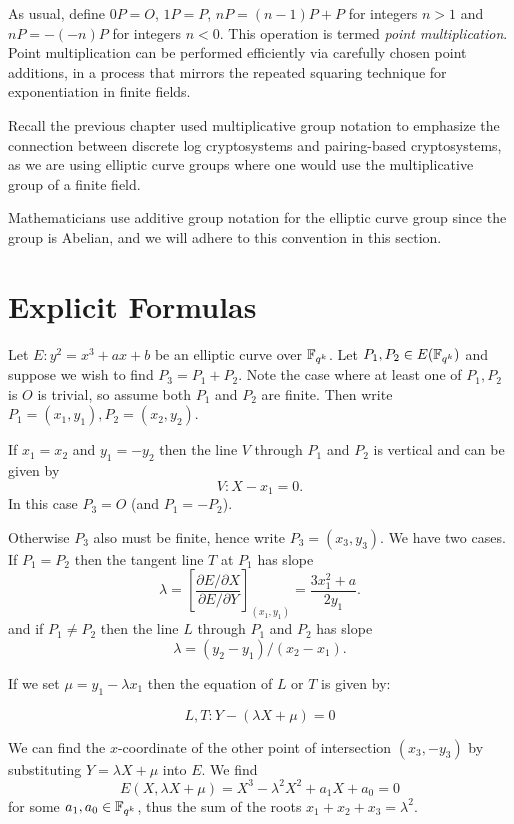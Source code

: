 As usual, define $0 P = O$, $1 P = P$,
$n P = (n-1)P + P$ for integers $n > 1$ and $n P = -(-n)P$ for integers
$n < 0$.
This operation is termed \emph{point multiplication}.
Point multiplication can be performed efficiently via carefully
chosen point additions, in a process that mirrors the repeated
squaring technique for exponentiation in finite fields.

Recall the previous chapter used multiplicative group notation to emphasize
the connection
between discrete log cryptosystems and pairing-based cryptosystems,
as we are using elliptic curve groups where one would use
the multiplicative group of a finite field.

Mathematicians use additive group notation for the elliptic curve group
since the group is Abelian, and we will adhere to this convention in this
section.

\section {Explicit Formulas}

Let $E: y^2 = x^3 + ax + b$ be an elliptic curve over $\mathbb{F}_{q^k}$. Let
$P_1, P_2 \in E(\mathbb{F}_{q^k})$ and suppose
we wish to find $P_3 = P_1 + P_2$.
Note the case where at least one of $P_1, P_2$ is $O$ is trivial,
so assume both $P_1$ and $P_2$ are finite.
Then write $P_1 = (x_1, y_1), P_2 = (x_2, y_2)$.

If $x_1 = x_2$ and $y_1 = -y_2$
then the line $V$ through $P_1$ and $P_2$ is vertical and
can be given by
\[ V : X - x_1 = 0  . \]
In this case $P_3 = O$ (and $P_1 = -P_2$).

Otherwise $P_3$ also must be finite, hence write $P_3 = (x_3, y_3)$.
We have two cases. If $P_1 = P_2$ then the tangent line $T$ at
$P_1$
has slope
\[\lambda =
\left[ \frac{\partial E / \partial X}{\partial E/ \partial Y} \right]_{(x_1,y_1)}
= \frac{3x_1^2 + a}{2y_1} . \]
and if $P_1 \ne P_2$ then the line $L$ through $P_1$ and $P_2$ has slope
\[ \lambda = (y_2 - y_1)/(x_2 - x_1) . \]

If we set $\mu = y_1 - \lambda x_1$ then
the equation of $L$ or $T$ is given by:

\[ L, T :  Y - (\lambda X + \mu) = 0 \]

We can find the $x$-coordinate of the other point of intersection $(x_3, -y_3)$
by substituting $Y = \lambda X + \mu$ into $E$. We find
\[ E(X, \lambda X+\mu) = X^3 - \lambda^2 X^2 + a_1 X + a_0 = 0 \]
for some $a_1, a_0 \in \mathbb{F}_{q^k}$, thus the sum of the roots
$x_1 + x_2 + x_3 = \lambda^2$.

